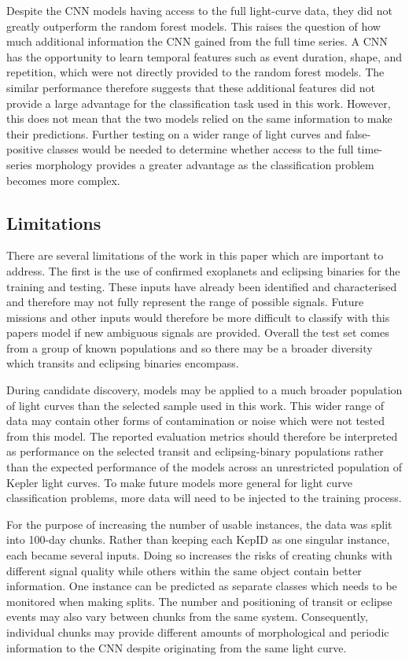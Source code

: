 Despite the CNN models having access to the full light-curve data, they did not greatly outperform the random forest models. This raises the question of how much additional information the CNN gained from the full time series. A CNN has the opportunity to learn temporal features such as event duration, shape, and repetition, which were not directly provided to the random forest models. The similar performance therefore suggests that these additional features did not provide a large advantage for the classification task used in this work. However, this does not mean that the two models relied on the same information to make their predictions. Further testing on a wider range of light curves and false-positive classes would be needed to determine whether access to the full time-series morphology provides a greater advantage as the classification problem becomes more complex.


\subsection{Limitations}

There are several limitations of the work in this paper which are important to address. The first is the use of confirmed exoplanets and eclipsing binaries for the training and testing. These inputs have already been identified and characterised and therefore may not fully represent the range of possible signals. Future missions and other inputs would therefore be more difficult to classify with this papers model if new ambiguous signals are provided. Overall the test set comes from a group of known populations and so there may be a broader diversity which transits and eclipsing binaries encompass. 

During candidate discovery, models may be applied to a much broader population of light curves than the selected sample used in this work. This wider range of data may contain other forms of contamination or noise which were not tested from this model. The reported evaluation metrics should therefore be interpreted as performance on the selected transit and eclipsing-binary populations rather than the expected performance of the models across an unrestricted population of Kepler light curves. To make future models more general for light curve classification problems, more data will need to be injected to the training process.


For the purpose of increasing the number of usable instances, the data was split into 100-day chunks. Rather than keeping each KepID as one singular instance, each became several inputs. Doing so increases the risks of creating chunks with different signal quality while others within the same object contain better information. One instance can be predicted as separate classes which needs to be monitored when making splits. The number and positioning of transit or eclipse events may also vary between chunks from the same system. Consequently, individual chunks may provide different amounts of morphological and periodic information to the CNN despite originating from the same light curve. 

